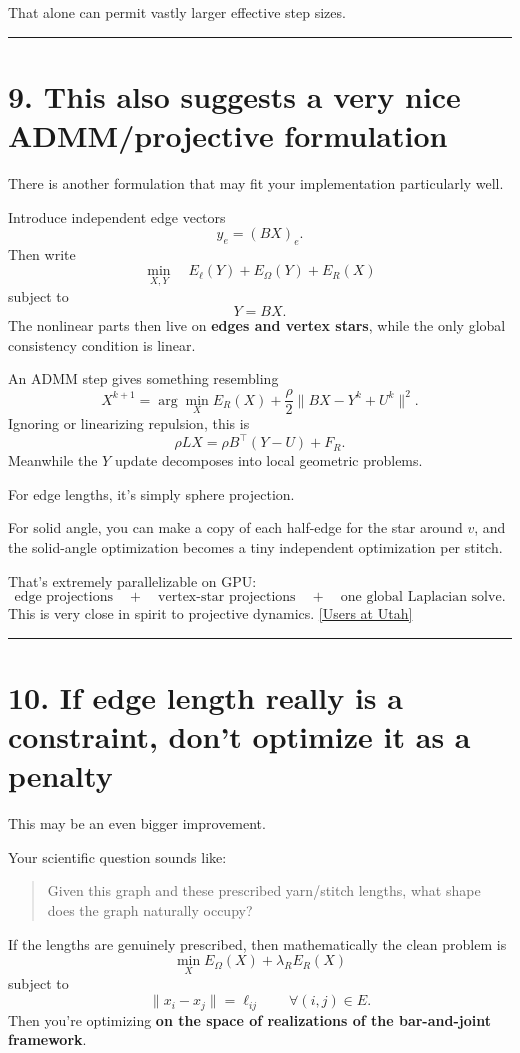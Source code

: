 \documentclass[11pt]{article}
\begin{document}
That alone can permit vastly larger effective step sizes.

\bigskip\hrule

\section*{9. This also suggests a very nice ADMM/projective formulation}

There is another formulation that may fit your implementation particularly
well.

Introduce independent edge vectors
\[
y_e=(BX)_e.
\]
Then write
\[
\min_{X,Y}
\quad
E_\ell(Y)
+
E_\Omega(Y)
+
E_R(X)
\]
subject to
\[
Y=BX.
\]
The nonlinear parts then live on \textbf{edges and vertex stars}, while the
only global consistency condition is linear.

An ADMM step gives something resembling
\[
X^{k+1}
=
\arg\min_X
E_R(X)
+
\frac{\rho}{2}
\|BX-Y^k+U^k\|^2.
\]
Ignoring or linearizing repulsion, this is
\[
\boxed{
\rho L X
=
\rho B^\top(Y-U)+F_R.
}
\]
Meanwhile the \(Y\) update decomposes into local geometric problems.

For edge lengths, it's simply sphere projection.

For solid angle, you can make a copy of each half-edge for the star around
\(v\), and the solid-angle optimization becomes a tiny independent
optimization per stitch.

That's extremely parallelizable on GPU:
\[
\text{edge projections}
\quad+\quad
\text{vertex-star projections}
\quad+\quad
\text{one global Laplacian solve}.
\]
This is very close in spirit to projective dynamics.
\href{https://users.cs.utah.edu/~ladislav/bouaziz14projective/bouaziz14projective.pdf?utm_source=chatgpt.com}{[Users at Utah]}

\bigskip\hrule

\section*{10. If edge length really is a constraint, don't optimize it as a penalty}

This may be an even bigger improvement.

Your scientific question sounds like:
\begin{quote}
Given this graph and these prescribed yarn/stitch lengths, what shape does
the graph naturally occupy?
\end{quote}
If the lengths are genuinely prescribed, then mathematically the clean
problem is
\[
\boxed{
\min_X
E_\Omega(X)+\lambda_R E_R(X)
}
\]
subject to
\[
\boxed{
\|x_i-x_j\|=\ell_{ij}
\qquad\forall(i,j)\in E.
}
\]
Then you're optimizing \textbf{on the space of realizations of the
bar-and-joint framework}.
\end{document}
